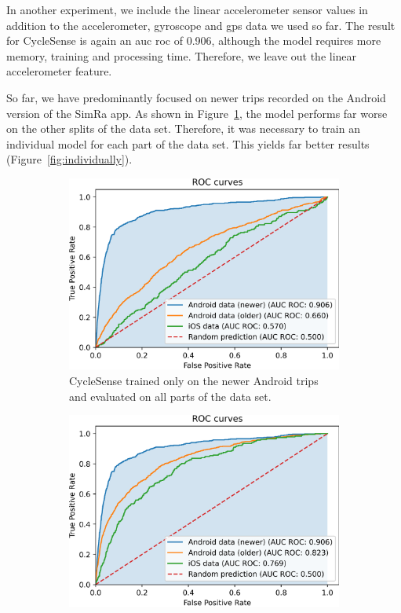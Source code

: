 In another experiment, we include the linear accelerometer sensor values in addition to the accelerometer, gyroscope and \ac{gps} data we used so far.
The result for CycleSense is again an \ac{auc} \ac{roc} of 0.906, although the model requires more memory, training and processing time.
Therefore, we leave out the linear accelerometer feature.

So far, we have predominantly focused on newer trips recorded on the Android version of the SimRa app.
As shown in Figure~\ref{fig:traindonone}, the model performs far worse on the other splits of the data set.
Therefore, it was necessary to train an individual model for each part of the data set.
This yields far better results (Figure~\ref{fig:individually}).

\begin{figure}[t]
	\centering
	\begin{subfigure}[b]{0.475\textwidth}
		\centering
		\includegraphics[width=\textwidth]{fig/rocauctrainedon73.png}
		\caption{\small CycleSense trained only on the newer Android trips and evaluated on all parts of the data set.}
		\label{fig:traindonone}
	\end{subfigure}
	\hfill
	\begin{subfigure}[b]{0.475\textwidth}
		\centering
		\includegraphics[width=\textwidth]{fig/rocauctrainedindividually.png}

\end{subfigure}
\end{figure}
